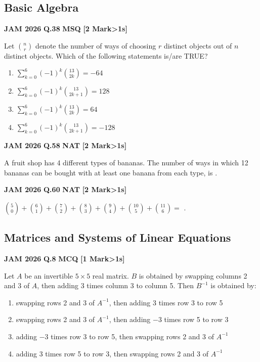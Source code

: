 \documentclass[11pt,a4paper]{article}
\newcommand{\pyqheader}[4]{%
    \noindent\begin{tcolorbox}[
        colback=badgebg,
        colframe=secondary,
        arc=2mm,
        boxrule=0.6pt,
        top=1.5mm,bottom=1.5mm,left=2mm,right=2mm
    ]
        \textbf{\textcolor{primary}{JAM #1}} \hfill \textbf{Q.#2} \hfill \textsc{\textbf{#3}} \hfill \textbf{[#4 Mark\ifnum#4>1s\fi]}
    \end{tcolorbox}\vspace{-1mm}
}
\begin{document}
\subsection{Basic Algebra}

\pyqheader{2026}{38}{MSQ}{2}
Let $\binom{n}{r}$ denote the number of ways of choosing $r$ distinct objects out of $n$ distinct objects. Which of the following statements is/are TRUE?
\begin{enumerate}[label=(\Alph*)]
    \item $\sum_{k=0}^{6}(-1)^{k}\binom{13}{2k}=-64$
    \item $\sum_{k=0}^{6}(-1)^{k}\binom{13}{2k+1}=128$
    \item $\sum_{k=0}^{6}(-1)^{k}\binom{13}{2k}=64$
    \item $\sum_{k=0}^{6}(-1)^{k}\binom{13}{2k+1}=-128$
\end{enumerate}

\pyqheader{2026}{58}{NAT}{2}
A fruit shop has 4 different types of bananas. The number of ways in which 12 bananas can be bought with at least one banana from each type, is \underline{\hspace{1.5cm}}.

\pyqheader{2026}{60}{NAT}{2}
$\binom{5}{0}+\binom{6}{1}+\binom{7}{2}+\binom{8}{3}+\binom{9}{4}+\binom{10}{5}+\binom{11}{6}=$ \underline{\hspace{1.5cm}}.

\subsection{Matrices and Systems of Linear Equations}

\pyqheader{2026}{8}{MCQ}{1}
Let $A$ be an invertible $5\times 5$ real matrix. $B$ is obtained by swapping columns 2 and 3 of $A$, then adding 3 times column 3 to column 5. Then $B^{-1}$ is obtained by:
\begin{enumerate}[label=(\Alph*)]
    \item swapping rows 2 and 3 of $A^{-1}$, then adding 3 times row 3 to row 5
    \item swapping rows 2 and 3 of $A^{-1}$, then adding $-3$ times row 5 to row 3
    \item adding $-3$ times row 3 to row 5, then swapping rows 2 and 3 of $A^{-1}$
    \item adding 3 times row 5 to row 3, then swapping rows 2 and 3 of $A^{-1}$
\end{enumerate}
\end{document}
